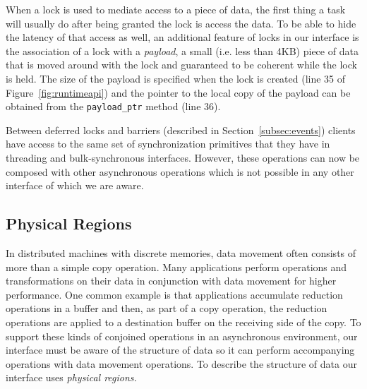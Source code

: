 When a lock is used to mediate access to a piece of data, the first thing a task will usually
do after being granted the lock is access the data.  To be able to hide the latency of that
access as well, an additional feature of locks in our interface is the association of a lock with a
{\em payload}, a small (i.e. less than 4KB) 
piece of data that is moved around with the lock and guaranteed to be coherent while 
the lock is held.  The size of the payload is specified when the lock is created (line 35 of Figure~\ref{fig:runtimeapi}) and
the pointer to the local copy of the payload can be obtained from the {\tt payload\_ptr} method
(line 36).

Between deferred locks and barriers (described in Section~\ref{subsec:events}) clients 
have access to the same set of synchronization primitives that they have
in threading and bulk-synchronous interfaces.  However, these operations can now 
be composed with other asynchronous operations which is not possible in any other interface
of which we are aware.



\subsection{Physical Regions}
\label{subsec:phyreg}
In distributed machines with discrete memories, data movement often consists of more
than a simple copy operation.  Many applications perform operations and transformations on
their data in conjunction with data movement for higher performance.  One common example is 
that applications accumulate reduction operations in a buffer and then, as part of a copy operation,
the reduction operations are applied to a destination buffer on the receiving side of the copy.  
To support these kinds of conjoined operations in an asynchronous environment, our interface 
must be aware of the structure of data so it can perform accompanying operations with 
data movement operations.  To describe the structure of data our interface uses {\em physical regions.}

